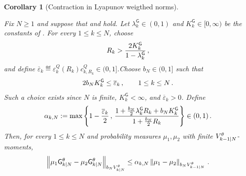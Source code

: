 \documentclass[11pt]{article}
\theoremstyle{plain}
\newtheorem{corollary}[theorem]{Corollary}
\theoremstyle{definition}
\theoremstyle{remark}
\begin{document}

\begin{corollary}[Contraction in Lyapunov weigthed norms]
\label{cor:contractive_forward_smoothing}

Fix $N\ge1$ and suppose that  and 
hold. Let $\lambda_k^{\mathsf G}\in(0,1)$ and $K_k^{\mathsf G} \in[0,\infty) $ be the constants of . For every $1\le k\le N$, choose
\begin{equation}
\label{eq:guided_contraction_radius}
R_k> \frac{2K_k^{\mathsf G}}{1-\lambda_k^{\mathsf G}} \,,
\end{equation}
and define $\overline\varepsilon_k \eqdef \varepsilon_k^Q(R_k)c_{k,R_k}^Q \in(0,1]$.Choose $b_N\in(0,1]$ such that
$$
2b_NK_k^{\mathsf G} \le \overline\varepsilon_k \,,
\qquad 1\le k\le N \,.
$$
Such a choice exists since $N$ is finite, $K_k^{\mathsf G}<\infty$, and $\overline\varepsilon_k>0$. Define
\begin{equation}
\label{eq:guided_contraction_factor}
\alpha_{k,N}
:=
\max\left\{ 1-\frac{\overline\varepsilon_k}{2} \, , \, \frac{ 1+\frac{b_N}{2}\lambda_k^{\mathsf G}R_k +b_NK_k^{\mathsf G}}{ 1 +\frac{b_N}{2}R_k } \right\}
\in(0,1) \,.
\end{equation}
Then, for every $1\le k\le N$ and probability measures $\mu_1,\mu_2$ with finite $\twistedlyap{k-1}{N}[\theta]$-moments,
\begin{equation}
\label{eq:guided_one_step_contraction}
\vnorm[ \mu_1\fsmk{k}{N}[\theta] - \mu_2\fsmk{k}{N}[\theta] ][b_N\twistedlyap{k}{N}[\theta]]
\le \alpha_{k,N} \vnorm[ \mu_1-\mu_2 ][b_N\twistedlyap{k-1}{N}[\theta]] \eqsp.
\end{equation}
\end{corollary}
\end{document}
